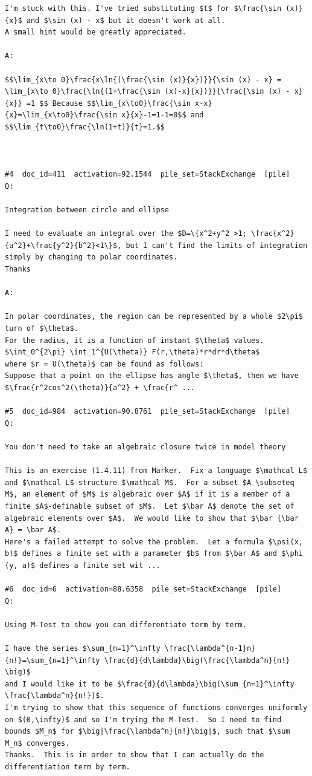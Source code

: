 \begin{verbatim}
I'm stuck with this. I've tried substituting $t$ for $\frac{\sin (x)}{x}$ and $\sin (x) - x$ but it doesn't work at all. 
A small hint would be greatly appreciated. 

A:

$$\lim_{x\to 0}\frac{x\ln{(\frac{\sin (x)}{x})}}{\sin (x) - x} =  \lim_{x\to 0}\frac{\ln{(1+\frac{\sin (x)-x}{x})}}{\frac{\sin (x) - x}{x}} =1 $$ Because $$\lim_{x\to0}\frac{\sin x-x}{x}=\lim_{x\to0}\frac{\sin x}{x}-1=1-1=0$$ and $$\lim_{t\to0}\frac{\ln(1+t)}{t}=1.$$



#4  doc_id=411  activation=92.1544  pile_set=StackExchange  [pile]
Q:

Integration between circle and ellipse

I need to evaluate an integral over the $D=\{x^2+y^2 >1; \frac{x^2}{a^2}+\frac{y^2}{b^2}<1\}$, but I can't find the limits of integration simply by changing to polar coordinates.
Thanks

A:

In polar coordinates, the region can be represented by a whole $2\pi$ turn of $\theta$.
For the radius, it is a function of instant $\theta$ values.
$\int_0^{2\pi} \int_1^{U(\theta)} F(r,\theta)*r*dr*d\theta$
where $r = U(\theta)$ can be found as follows:
Suppose that a point on the ellipse has angle $\theta$, then we have $\frac{r^2cos^2(\theta)}{a^2} + \frac{r^ ...

#5  doc_id=984  activation=90.8761  pile_set=StackExchange  [pile]
Q:

You don't need to take an algebraic closure twice in model theory

This is an exercise (1.4.11) from Marker.  Fix a language $\mathcal L$ and $\mathcal L$-structure $\mathcal M$.  For a subset $A \subseteq M$, an element of $M$ is algebraic over $A$ if it is a member of a finite $A$-definable subset of $M$.  Let $\bar A$ denote the set of algebraic elements over $A$.  We would like to show that $\bar {\bar A} = \bar A$.
Here's a failed attempt to solve the problem.  Let a formula $\psi(x, b)$ defines a finite set with a parameter $b$ from $\bar A$ and $\phi (y, a)$ defines a finite set wit ...

#6  doc_id=6  activation=88.6358  pile_set=StackExchange  [pile]
Q:

Using M-Test to show you can differentiate term by term.

I have the series $\sum_{n=1}^\infty \frac{\lambda^{n-1}n}{n!}=\sum_{n=1}^\infty \frac{d}{d\lambda}\big(\frac{\lambda^n}{n!} \big)$
and I would like it to be $\frac{d}{d\lambda}\big(\sum_{n=1}^\infty \frac{\lambda^n}{n!})$.
I'm trying to show that this sequence of functions converges uniformly on $(0,\infty)$ and so I'm trying the M-Test.  So I need to find bounds $M_n$ for $\big|\frac{\lambda^n}{n!}\big|$, such that $\sum M_n$ converges.
Thanks.  This is in order to show that I can actually do the differentiation term by term.


\end{verbatim}
